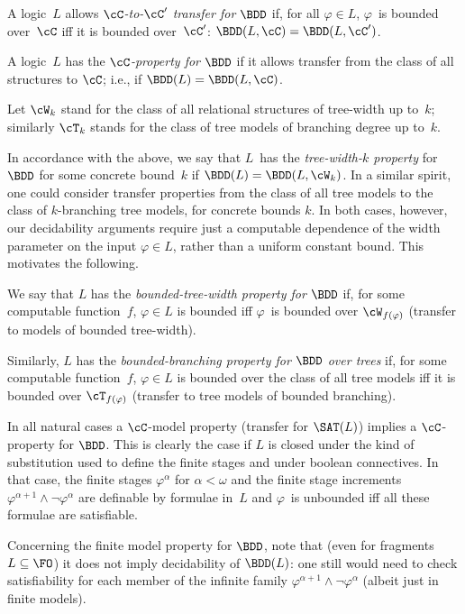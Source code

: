 \documentclass{LMCS}
\begin{document}
\begin{defi}
A logic~$L$ allows \emph{$\cC$-to-$\cC'$ transfer for $\BDD$}
if, for all $\varphi \in L$,
$\varphi$~is bounded over~$\cC$ iff it is bounded over~$\cC'$\?:
$\BDD(L,\cC) = \BDD(L,\cC')$.

A logic~$L$ has the \emph{$\cC$-property for $\BDD$}
if it allows transfer from the class of all structures to $\cC$\?;
i.e., if $\BDD(L) = \BDD(L,\cC)$.
\end{defi}

Let $\cW_k$ stand for the class of all relational structures
of tree-width up to~$k$\?;
similarly $\cT_k$ stands for the class of tree models
of branching degree up to~$k$.

In accordance with the above, we say that
$L$~has the \emph{tree-width-$k$ property} for $\BDD$ for some concrete
bound~$k$ if $\BDD(L) = \BDD(L,\cW_k)$. In a similar spirit,
one could consider transfer properties from the class of all tree
models to the class of $k$-branching tree models, for concrete bounds $k$.
In both cases, however, our decidability arguments 
require just a computable dependence of the width parameter
on the input $\varphi \in L$, rather than a uniform constant bound.
This motivates the following.

\begin{defi}
We say that $L$ has the \emph{bounded-tree-width property for $\BDD$}
if, for some computable function~$f$,
$\varphi \in L$ is bounded iff $\varphi$~is bounded over $\cW_{f(\varphi)}$
(transfer to models of bounded tree-width).

Similarly, $L$ has the \emph{bounded-branching property for
$\BDD$ over trees} if, for some computable function~$f$,
$\varphi \in L$ is bounded over the class of all tree models
iff it is bounded over $\cT_{f(\varphi)}$
(transfer to tree models of bounded branching).
\end{defi}

In all natural cases a $\cC$-model property (transfer for $\SAT(L)$)
implies a $\cC$-property for $\BDD$. This is clearly the
case if $L$ is closed under the kind of substitution used to define
the finite stages and under boolean connectives. In that case,
the finite stages $\varphi^\alpha$ for $\alpha < \omega$ and the finite
stage increments $\varphi^{\alpha +1} \wedge \neg \varphi^\alpha$ are
definable by formulae in~$L$ and $\varphi$~is unbounded iff
all these formulae are satisfiable.

Concerning the finite model property for $\BDD$, note that
(even for fragments $L \subseteq \FO$) it does not
imply decidability of $\BDD(L)$\?: one still would need to check
satisfiability for each member of the infinite family
$\varphi^{\alpha+1} \wedge \neg \varphi^\alpha$ (albeit just in finite models).
\end{document}
